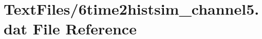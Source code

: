 \hypertarget{6time2histsim__channel5_8dat}{}\section{Text\+Files/6time2histsim\+\_\+channel5.dat File Reference}
\label{6time2histsim__channel5_8dat}
